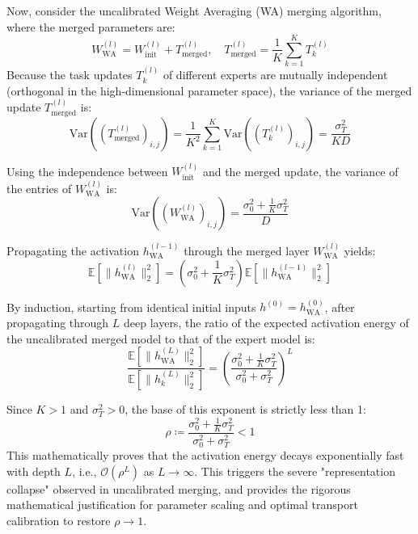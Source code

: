 \documentclass{article}
\theoremstyle{plain}
\theoremstyle{definition}
\theoremstyle{remark}
\begin{document}
Now, consider the uncalibrated Weight Averaging (WA) merging algorithm, where the merged parameters are:
\begin{equation}
    W_{\text{WA}}^{(l)} = W_{\text{init}}^{(l)} + T_{\text{merged}}^{(l)}, \quad T_{\text{merged}}^{(l)} = \frac{1}{K} \sum_{k=1}^K T_k^{(l)}
\end{equation}
Because the task updates $T_k^{(l)}$ of different experts are mutually independent (orthogonal in the high-dimensional parameter space), the variance of the merged update $T_{\text{merged}}^{(l)}$ is:
\begin{equation}
    \text{Var}\left( (T_{\text{merged}}^{(l)})_{i,j} \right) = \frac{1}{K^2} \sum_{k=1}^K \text{Var}\left( (T_k^{(l)})_{i,j} \right) = \frac{\sigma_T^2}{K D}
\end{equation}

Using the independence between $W_{\text{init}}^{(l)}$ and the merged update, the variance of the entries of $W_{\text{WA}}^{(l)}$ is:
\begin{equation}
    \text{Var}\left( (W_{\text{WA}}^{(l)})_{i,j} \right) = \frac{\sigma_0^2 + \frac{1}{K} \sigma_T^2}{D}
\end{equation}

Propagating the activation $h_{\text{WA}}^{(l-1)}$ through the merged layer $W_{\text{WA}}^{(l)}$ yields:
\begin{equation}
    \mathbb{E}\left[ \|h_{\text{WA}}^{(l)}\|_2^2 \right] = \left( \sigma_0^2 + \frac{1}{K} \sigma_T^2 \right) \mathbb{E}\left[ \|h_{\text{WA}}^{(l-1)}\|_2^2 \right]
\end{equation}

By induction, starting from identical initial inputs $h^{(0)} = h_{\text{WA}}^{(0)}$, after propagating through $L$ deep layers, the ratio of the expected activation energy of the uncalibrated merged model to that of the expert model is:
\begin{equation}
    \frac{\mathbb{E}\left[ \|h_{\text{WA}}^{(L)}\|_2^2 \right]}{\mathbb{E}\left[ \|h_k^{(L)}\|_2^2 \right]} = \left( \frac{\sigma_0^2 + \frac{1}{K} \sigma_T^2}{\sigma_0^2 + \sigma_T^2} \right)^L
\end{equation}

Since $K > 1$ and $\sigma_T^2 > 0$, the base of this exponent is strictly less than 1:
\begin{equation}
    \rho \coloneqq \frac{\sigma_0^2 + \frac{1}{K} \sigma_T^2}{\sigma_0^2 + \sigma_T^2} < 1
\end{equation}
This mathematically proves that the activation energy decays exponentially fast with depth $L$, i.e., $\mathcal{O}(\rho^L)$ as $L \to \infty$. This triggers the severe "representation collapse" observed in uncalibrated merging, and provides the rigorous mathematical justification for parameter scaling and optimal transport calibration to restore $\rho \to 1$.
\end{document}
